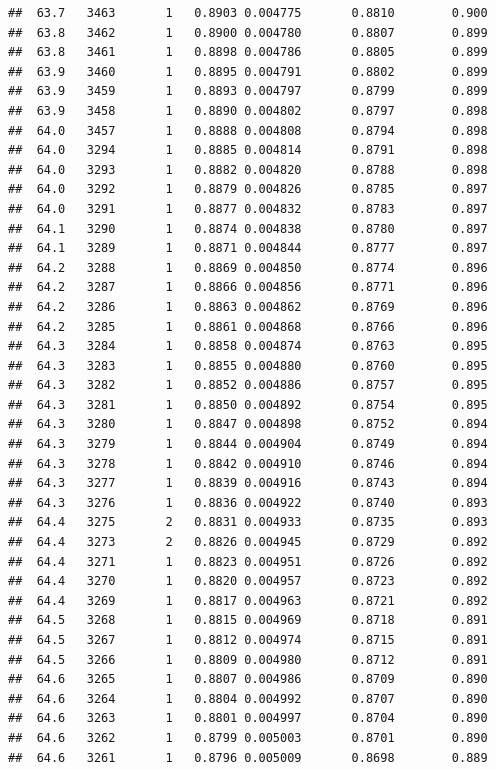 \documentclass[
]{book}
\begin{document}
\begin{verbatim}
##  63.7   3463       1   0.8903 0.004775       0.8810        0.900
##  63.8   3462       1   0.8900 0.004780       0.8807        0.899
##  63.8   3461       1   0.8898 0.004786       0.8805        0.899
##  63.9   3460       1   0.8895 0.004791       0.8802        0.899
##  63.9   3459       1   0.8893 0.004797       0.8799        0.899
##  63.9   3458       1   0.8890 0.004802       0.8797        0.898
##  64.0   3457       1   0.8888 0.004808       0.8794        0.898
##  64.0   3294       1   0.8885 0.004814       0.8791        0.898
##  64.0   3293       1   0.8882 0.004820       0.8788        0.898
##  64.0   3292       1   0.8879 0.004826       0.8785        0.897
##  64.0   3291       1   0.8877 0.004832       0.8783        0.897
##  64.1   3290       1   0.8874 0.004838       0.8780        0.897
##  64.1   3289       1   0.8871 0.004844       0.8777        0.897
##  64.2   3288       1   0.8869 0.004850       0.8774        0.896
##  64.2   3287       1   0.8866 0.004856       0.8771        0.896
##  64.2   3286       1   0.8863 0.004862       0.8769        0.896
##  64.2   3285       1   0.8861 0.004868       0.8766        0.896
##  64.3   3284       1   0.8858 0.004874       0.8763        0.895
##  64.3   3283       1   0.8855 0.004880       0.8760        0.895
##  64.3   3282       1   0.8852 0.004886       0.8757        0.895
##  64.3   3281       1   0.8850 0.004892       0.8754        0.895
##  64.3   3280       1   0.8847 0.004898       0.8752        0.894
##  64.3   3279       1   0.8844 0.004904       0.8749        0.894
##  64.3   3278       1   0.8842 0.004910       0.8746        0.894
##  64.3   3277       1   0.8839 0.004916       0.8743        0.894
##  64.3   3276       1   0.8836 0.004922       0.8740        0.893
##  64.4   3275       2   0.8831 0.004933       0.8735        0.893
##  64.4   3273       2   0.8826 0.004945       0.8729        0.892
##  64.4   3271       1   0.8823 0.004951       0.8726        0.892
##  64.4   3270       1   0.8820 0.004957       0.8723        0.892
##  64.4   3269       1   0.8817 0.004963       0.8721        0.892
##  64.5   3268       1   0.8815 0.004969       0.8718        0.891
##  64.5   3267       1   0.8812 0.004974       0.8715        0.891
##  64.5   3266       1   0.8809 0.004980       0.8712        0.891
##  64.6   3265       1   0.8807 0.004986       0.8709        0.890
##  64.6   3264       1   0.8804 0.004992       0.8707        0.890
##  64.6   3263       1   0.8801 0.004997       0.8704        0.890
##  64.6   3262       1   0.8799 0.005003       0.8701        0.890
##  64.6   3261       1   0.8796 0.005009       0.8698        0.889

\end{verbatim}
\end{document}
